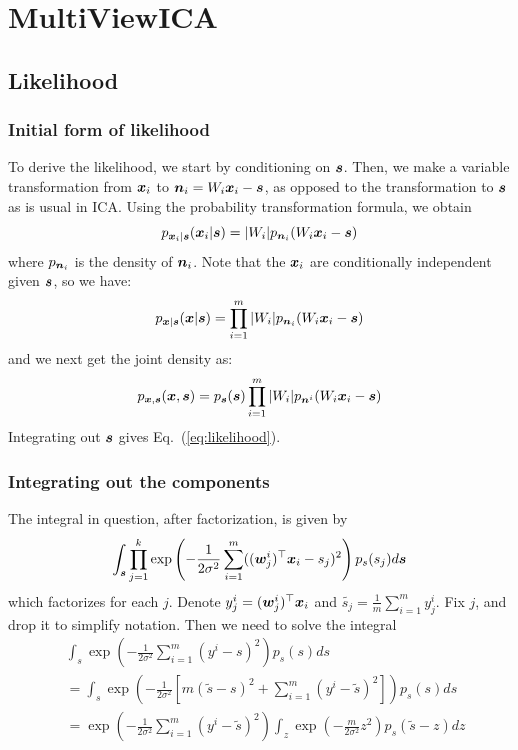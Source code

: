 \chapter{MultiViewICA}
\section{Likelihood}
\label{sec:app_likelihood}
\subsection{Initial form of likelihood}\label{sec:appendix:likelihood_transform}

To derive the likelihood, we start by conditioning on $\boldsymbol{s}$. Then, we make a variable transformation from $\boldsymbol{x}_i$ to $\boldsymbol{n}_i=W_i\boldsymbol{x}_i-\boldsymbol{s}$, as opposed to the transformation to $\boldsymbol{s}$ as is usual in ICA. Using the probability transformation formula, we obtain
\begin{equation}
p_{\boldsymbol{x}_i|\boldsymbol{s}}(\boldsymbol{x}_i|\boldsymbol{s})=|W_i|p_{\boldsymbol{n}_i}(W_i\boldsymbol{x}_i-\boldsymbol{s})    
\end{equation}
where $p_{\boldsymbol{n}_i}$ is the density of $\boldsymbol{n}_i$. Note that the $\boldsymbol{x}_i$ are conditionally independent given $\boldsymbol{s}$, so we have:
\begin{equation}
  p_{\boldsymbol{x}|\boldsymbol{s}}(\boldsymbol{x}|\boldsymbol{s})=\prod_{i=1}^m  |W_i| p_{\boldsymbol{n}_i}(W_i\boldsymbol{x}_i-\boldsymbol{s})
\end{equation}
and we next get the joint density as:
\begin{equation}
  p_{\boldsymbol{x}, \boldsymbol{s}}(\boldsymbol{x},\boldsymbol{s})=p_{\boldsymbol{s}}(\boldsymbol{s}) \prod_{i=1}^m  |W_i| p_{\boldsymbol{n}^i}(W_i\boldsymbol{x}_i-\boldsymbol{s})
\end{equation}
Integrating out $\boldsymbol{s}$ gives Eq.~(\ref{eq:likelihood}).


\subsection{Integrating out the components}\label{sec:appendix:integration}

The integral in question, after factorization, is given by
\begin{equation}
\int_{\boldsymbol{s}} \prod_{j=1}^k \exp \left( -\frac{1}{2\sigma^2} \sum_{i=1}^m ((\boldsymbol{w}_j^i)^{\top}\boldsymbol{x}_i-s_j)^2 \right) p_{s}(s_j) d\boldsymbol{s}
\end{equation}
which factorizes for each $j$. Denote $y^i_j=(\boldsymbol{w}_j^i)^{\top}\boldsymbol{x}_i$ and $\tilde{s_j}=\frac1m\sum_{i=1}^m y^i_j$.  Fix $j$, and drop it to simplify notation. Then we need to solve the integral
\begin{align*}
   &\int_s \exp \left(-\frac{1}{2\sigma^2} \sum_{i=1}^m (y^i-s)^2 \right) p_{s}(s)ds\\
   &=\int_s \exp \left(-\frac{1}{2\sigma^2} [ m(\tilde{s}-s)^2 + \sum_{i=1}^m (y^i-\tilde{s})^2] \right) p_{s}(s)ds \\ 
&= \exp \left(-\frac{1}{2\sigma^2}\sum_{i=1}^m (y^i-\tilde{s})^2 \right) 
\int_z \exp \left(-\frac{m}{2\sigma^2} z^2 \right) p_{s}(\tilde{s}-z) dz
\end{align*}

